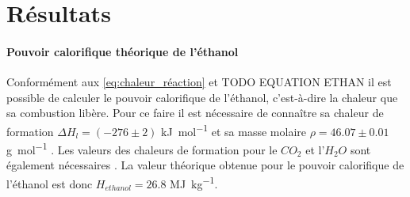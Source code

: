 \section{Résultats}

\paragraph*{Pouvoir calorifique théorique de l'éthanol}
Conformément aux \autoref{eq:chaleur_réaction} et TODO EQUATION ETHAN il est possible de calculer le pouvoir calorifique de l'éthanol, c'est-à-dire la chaleur que sa combustion libère. Pour ce faire il est nécessaire de connaître sa chaleur de formation \(\Delta H_{l} = (-276 \pm 2)\) \si{\kilo\joule\per\mol} et sa masse molaire \(\rho = 46.07 \pm 0.01\) \si{\gram\per\mol} \cite{ethanol-values}. Les valeurs des chaleurs de formation pour le \(CO_2\) et l'\(H_2O\) sont également nécessaires \cite{notice}. La valeur théorique obtenue pour le pouvoir calorifique de l'éthanol est donc \(H_{ethanol} = 26.8\) \si{\mega\joule\per\kilo\gram}.


